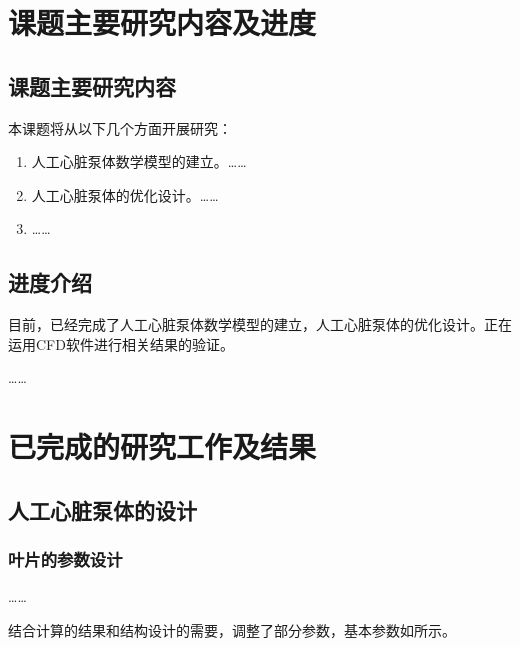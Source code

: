 
\section{课题主要研究内容及进度}

\subsection{课题主要研究内容}

本课题将从以下几个方面开展研究：

\begin{enumerate}[label=\arabic*.]
  \item 人工心脏泵体数学模型的建立。……
  \item 人工心脏泵体的优化设计。……
  \item ……
\end{enumerate}

\hitenter

\subsection{进度介绍}

目前，已经完成了人工心脏泵体数学模型的建立，人工心脏泵体的优化设计。正在运用CFD软件进行相关结果的验证。

……

\section{已完成的研究工作及结果}

\subsection{人工心脏泵体的设计}

\subsubsection{叶片的参数设计}

……

结合计算的结果和结构设计的需要，调整了部分参数，基本参数如所示。

